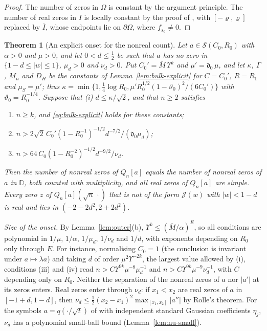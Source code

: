 \documentclass[11pt]{amsart}
\newtheorem{theorem}{Theorem}[section]
\theoremstyle{definition}
\theoremstyle{remark}
\numberwithin{equation}{section}
\newcommand{\D}{\mathbb{D}}
\begin{document}
\begin{proof}
The number of zeros in $\Omega$ is constant by the argument principle. The number of real zeros in $I$ is locally constant by the proof of \cite[Lemma~\ref{M-lem:constancy}]{Main}, with $[-\varrho,\varrho]$ replaced by $\overline I$, whose endpoints lie on $\partial\Omega$, where $f_{s_0}\ne0$.
\end{proof}

\begin{theorem}[An explicit onset for the nonreal count]\label{thm:quant}
Let $a\in\mathcal S(C_0,R_0)$ with $\alpha>0$ and $\mu>0$, and let $0<d\le\frac12$ be such that $a$ has no zero in $\{1-d\le|w|\le1\}$, $\mu_d>0$ and $\nu_d>0$. Put $C_0'=\overline M\,\Upsilon^k$ and $\mu'=\mathfrak d_0\,\mu$, and let $\kappa$, $\Gamma$, $M_n$ and $D_H$ be the constants of Lemma~\ref{lem:bulk-explicit} for $C=C_0'$, $R=R_1$ and $\mu_S=\mu'$; thus $\kappa=\min\{1,\frac14\log R_0,\mu'R_0^{1/2}(1-\vartheta_0)^2/(6C_0')\}$ with $\vartheta_0=R_0^{-1/4}$. Suppose that {\rm(i)} $d\le\kappa/\sqrt2$, and that $n\ge2$ satisfies
\begin{enumerate}
\item[(ii)] $n\ge k$, and \eqref{eq:bulk-explicit} holds for these constants;
\item[(iii)] $n>2\sqrt2\,C_0'(1-R_0^{-1})^{-1/2}d^{-7/2}/(\mathfrak d_0\mu_d)$;
\item[(iv)] $n>64\,C_0(1-R_0^{-2})^{-1/2}d^{-9/2}/\nu_d$.
\end{enumerate}
Then the number of nonreal zeros of $Q_n[a]$ equals the number of nonreal zeros of $a$ in $\D$, both counted with multiplicity, and all real zeros of $Q_n[a]$ are simple. Every zero $z$ of $Q_n[a](\sqrt n\,\cdot)$ that is not of the form $\mathcal J(w)$ with $|w|<1-d$ is real and lies in $(-2-2d^2,2+2d^2)$.
\end{theorem}

\emph{Size of the onset.} By Lemma~\ref{lem:outer}(b), $\Upsilon^k\le(\overline M/\alpha)^E$, so all conditions are polynomial in $1/\mu$, $1/\alpha$, $1/\mu_d$, $1/\nu_d$ and $1/d$, with exponents depending on $R_0$ only through $E$. For instance, normalising $C_0=1$ (the conclusion is invariant under $a\mapsto\lambda a$) and taking $d$ of order $\mu^2\Upsilon^{-2k}$, the largest value allowed by (i), conditions (iii) and (iv) read $n>C\Upsilon^{9k}\mu^{-8}\mu_d^{-1}$ and $n>C\Upsilon^{9k}\mu^{-9}\nu_d^{-1}$, with $C$ depending only on $R_0$. Neither the separation of the nonreal zeros of $a$ nor $|a'|$ at its zeros enters. Real zeros enter through $\nu_d$: if $x_1<x_2$ are real zeros of $a$ in $[-1+d,1-d]$, then $\nu_d\le\frac12(x_2-x_1)^2\max_{[x_1,x_2]}|a''|$ by Rolle's theorem. For the symbols $a=q(\cdot/\sqrt t)$ of \cite[\eqref{M-eq:heat-hermite}]{Main} with independent standard Gaussian coefficients $\eta_j$, $\nu_d$ has a polynomial small-ball bound (Lemma~\ref{lem:nu-small}).
\end{document}
